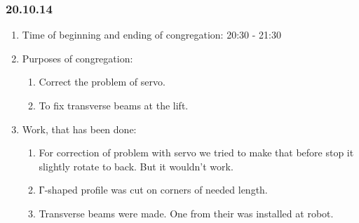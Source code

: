 	
\subsubsection{20.10.14}

\begin{enumerate}
	\item Time of beginning and ending of congregation:
	20:30 - 21:30
	\item Purposes of congregation:
	\begin{enumerate}
	  \item Correct the problem of servo.
	  
	  \item To fix transverse beams at the lift.
	  
    \end{enumerate}
    
	\item Work, that has been done:
	\begin{enumerate}
	  \item For correction of problem with servo we tried to make that before stop it slightly rotate to back. But it wouldn't work.
	  
      \item Г-shaped profile was cut on corners of needed length.
      
      \item Transverse beams were made. One from their was installed at robot.
      

\end{enumerate}
\end{enumerate}
